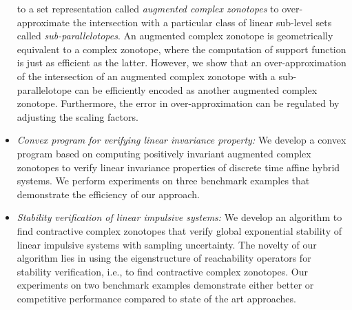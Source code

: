 \begin{itemize}
  to a set representation called \emph{augmented complex zonotopes} to
  over-approximate the intersection with a particular class of linear
  sub-level sets called \emph{sub-parallelotopes}.  An augmented
  complex zonotope is geometrically equivalent to a complex zonotope,
  where the computation of support function is just as efficient as
  the latter.  However, we show that an over-approximation of the
  intersection of an augmented complex zonotope with a
  sub-parallelotope can be efficiently encoded as another augmented
  complex zonotope.  Furthermore, the error in
  over-approximation can be regulated by adjusting the scaling
  factors.
\item \emph{Convex program for verifying linear invariance property:
}  We develop a convex program based on computing positively invariant
  augmented complex zonotopes to verify linear invariance properties
  of discrete time affine hybrid systems.  We perform experiments on
  three benchmark examples that demonstrate the efficiency of our
  approach. 
\item \emph{Stability verification of linear impulsive systems: } We
  develop an algorithm to find contractive complex zonotopes that
  verify global exponential stability of linear impulsive systems with
  sampling uncertainty.  The novelty of our algorithm lies in using
  the eigenstructure of reachability operators for stability
  verification, i.e., to find contractive complex zonotopes. Our
  experiments on two benchmark examples demonstrate either better or
  competitive performance compared to state of the art approaches.
\end{itemize}
%
